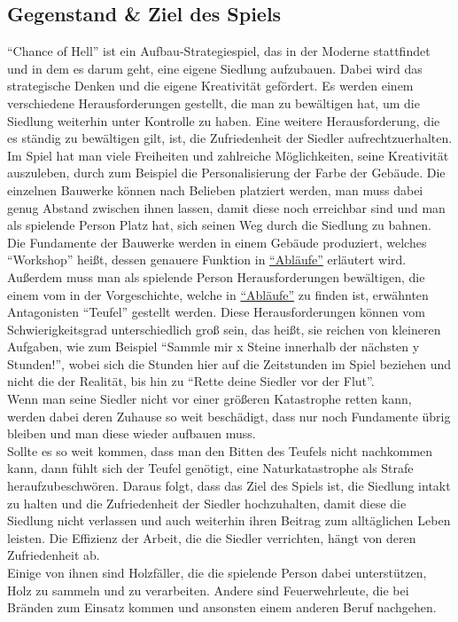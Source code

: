\documentclass[paper=A4,pagesize=auto,12pt,headinclude=true,footinclude=true,BCOR=0mm,DIV=calc]{scrartcl}
\newcommand{\sectionspace}{
	\vspace{0.5cm}
}
\newcommand{\gametitle}{Chance of Hell}
\begin{document}
\sectionspace
\subsection{Gegenstand \& Ziel des Spiels}\label{sec:Gegenstand}
"`\gametitle"' \space ist ein Aufbau-Strategiespiel, das in der Moderne stattfindet und in dem es darum geht, eine eigene Siedlung aufzubauen. Dabei wird das strategische Denken und die eigene Kreativität gefördert. Es werden einem verschiedene Herausforderungen gestellt, die man zu bewältigen hat, um die Siedlung weiterhin unter Kontrolle zu haben. Eine weitere Herausforderung, die es ständig zu bewältigen gilt, ist, die Zufriedenheit der Siedler aufrechtzuerhalten. \\
Im Spiel hat man viele Freiheiten und zahlreiche Möglichkeiten, seine Kreativität auszuleben, durch zum Beispiel die Personalisierung der Farbe der Gebäude. Die einzelnen Bauwerke können nach Belieben platziert werden, man muss dabei genug Abstand zwischen ihnen lassen, damit diese noch erreichbar sind und man als spielende Person Platz hat, sich seinen Weg durch die Siedlung zu bahnen. \\
Die Fundamente der Bauwerke werden in einem Gebäude produziert, welches "`Workshop"' heißt, dessen genauere Funktion in \hyperref[sec:Ablaeufe]{"`Abläufe"'} erläutert wird.\\
Außerdem muss man als spielende Person Herausforderungen bewältigen, die einem vom in der Vorgeschichte, welche in \hyperref[sec:Ablaeufe]{"`Abläufe"'} zu finden ist, erwähnten Antagonisten "`Teufel"' gestellt werden. Diese Herausforderungen können vom Schwierigkeitsgrad unterschiedlich groß sein, das heißt, sie reichen von kleineren Aufgaben, wie zum Beispiel "`Sammle mir x Steine innerhalb der nächsten y Stunden!"', wobei sich die Stunden hier auf die Zeitstunden im Spiel beziehen und nicht die der Realität, bis hin zu "`Rette deine Siedler vor der Flut"'. \\
Wenn man seine Siedler nicht vor einer größeren Katastrophe retten kann, werden dabei deren Zuhause so weit beschädigt, dass nur noch Fundamente übrig bleiben und man diese wieder aufbauen muss. \\
Sollte es so weit kommen, dass man den Bitten des Teufels nicht nachkommen kann, dann fühlt sich der Teufel genötigt, eine Naturkatastrophe als Strafe heraufzubeschwören.
Daraus folgt, dass das Ziel des Spiels ist, die Siedlung intakt zu halten und die %
 Zufriedenheit der Siedler hochzuhalten, damit diese die Siedlung nicht verlassen und auch weiterhin ihren Beitrag zum alltäglichen Leben leisten. Die Effizienz der Arbeit, die die Siedler verrichten, hängt von deren Zufriedenheit ab. \\
Einige von ihnen sind Holzfäller, die die spielende Person dabei unterstützen, Holz zu sammeln und zu verarbeiten. Andere sind Feuerwehrleute, die bei Bränden zum Einsatz kommen und ansonsten einem anderen Beruf nachgehen.
\end{document}
